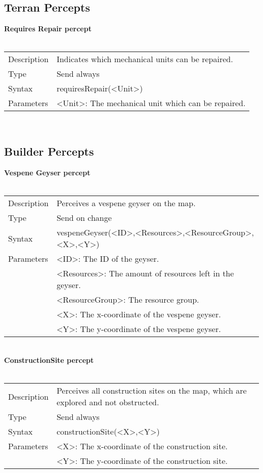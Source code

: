 \documentclass[english,11pt]{report}
\begin{document}
\subsection{Terran Percepts}
\textbf{Requires Repair percept}\\
\\
\begin{tabularx}{\textwidth}{lX}
 Description & Indicates which mechanical units can be repaired. \\
 Type & Send always \\
 Syntax & requiresRepair(<Unit>) \\
 Parameters &  <Unit>: The mechanical unit which can be repaired.
\end{tabularx} \\

\subsection{Builder Percepts}
\textbf{Vespene Geyser percept}\\
\\
\begin{tabularx}{\textwidth}{lX}
 Description & Perceives a vespene geyser on the map. \\
 Type & Send on change \\
 Syntax & vespeneGeyser(<ID>,<Resources>,<ResourceGroup>,<X>,<Y>) \\
 Parameters &              <ID>: The ID of the geyser.\\
            &       <Resources>: The amount of resources left in the geyser.\\
            &   <ResourceGroup>: The resource group.\\
            &               <X>: The x-coordinate of the vespene geyser. \\
            &               <Y>: The y-coordinate of the vespene geyser.
\end{tabularx} \\
\newpage
\noindent
\textbf{ConstructionSite percept}\\
\\
\begin{tabularx}{\textwidth}{lX}
 Description & Perceives all construction sites on the map, which are explored and not obstructed. \\
 Type & Send always \\
 Syntax & constructionSite(<X>,<Y>) \\
 Parameters &   <X>: The x-coordinate of the construction site. \\
            &   <Y>: The y-coordinate of the construction site.
\end{tabularx} \\
\end{document}
